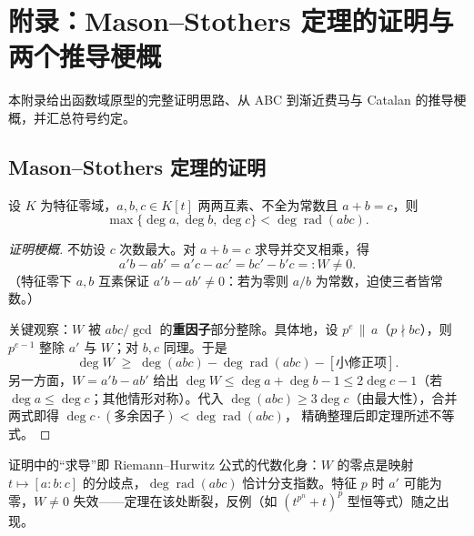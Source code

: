 \section{附录：Mason--Stothers 定理的证明与两个推导梗概}\label{sec:appendix}

本附录给出函数域原型的完整证明思路、从 ABC 到渐近费马与 Catalan 的推导梗概，并汇总符号约定。

\subsection{Mason--Stothers 定理的证明}\label{sec:app-mason}

\begin{theorem}\label{thm:mason-app}
    设 $K$ 为特征零域，$a, b, c \in K[t]$ 两两互素、不全为常数且 $a + b = c$，则
    \begin{equation}
        \max\{\deg a, \deg b, \deg c\} < \deg \operatorname{rad}(abc).
    \end{equation}
\end{theorem}

\begin{proof}[证明梗概]
    不妨设 $c$ 次数最大。对 $a + b = c$ 求导并交叉相乘，得
    \begin{equation}
        a'b - a b' = a'c - a c' = b c' - b' c =: W \neq 0 .
    \end{equation}
    （特征零下 $a, b$ 互素保证 $a'b - ab' \neq 0$：若为零则 $a/b$ 为常数，迫使三者皆常数。）

    关键观察：$W$ 被 $abc / \gcd$ 的\textbf{重因子}部分整除。具体地，设 $p^e \,\|\, a$（$p \nmid bc$），则 $p^{e-1}$ 整除 $a'$ 与 $W$；对 $b, c$ 同理。于是
    \begin{equation}
        \deg W \;\geq\; \deg(abc) - \deg\operatorname{rad}(abc) - [\text{小修正项}] .
    \end{equation}
    另一方面，$W = a'b - ab'$ 给出 $\deg W \leq \deg a + \deg b - 1 \leq 2\deg c - 1$（若 $\deg a \leq \deg c$；其他情形对称）。代入 $\deg(abc) \geq 3 \deg c$（由最大性），合并两式即得
    $\deg c \cdot (\text{多余因子}) < \deg \operatorname{rad}(abc)$，
    精确整理后即定理所述不等式。
\end{proof}

\begin{remark}
    证明中的“求导”即 Riemann--Hurwitz 公式的代数化身：$W$ 的零点是映射 $t \mapsto [a:b:c]$ 的分歧点，$\deg\operatorname{rad}(abc)$ 恰计分支指数。特征 $p$ 时 $a'$ 可能为零，$W \neq 0$ 失效——定理在该处断裂，反例（如 $(t^{p^n} + t)^p$ 型恒等式）随之出现。
\end{remark}

